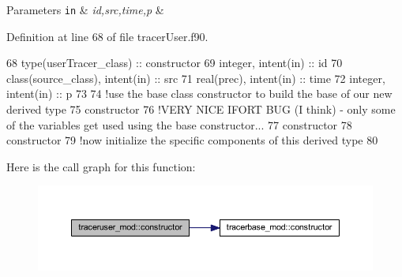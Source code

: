 \begin{DoxyParams}[1]{Parameters}
\mbox{\tt in}  & {\em id,src,time,p} & \\
\hline
\end{DoxyParams}


Definition at line 68 of file tracer\+User.\+f90.


\begin{DoxyCode}
68     \textcolor{keywordtype}{type}(userTracer\_class) :: constructor
69     \textcolor{keywordtype}{integer}, \textcolor{keywordtype}{intent(in)} :: id
70     \textcolor{keywordtype}{class}(source\_class), \textcolor{keywordtype}{intent(in)} :: src
71     \textcolor{keywordtype}{real(prec)}, \textcolor{keywordtype}{intent(in)} :: time
72     \textcolor{keywordtype}{integer}, \textcolor{keywordtype}{intent(in)} :: p
73 
74     \textcolor{comment}{!use the base class constructor to build the base of our new derived type}
75     constructor%
76     \textcolor{comment}{!VERY NICE IFORT BUG (I think) - only some of the variables get used using the base constructor...}
77     constructor%
78     constructor%
79     \textcolor{comment}{!now initialize the specific components of this derived type}
80 
\end{DoxyCode}
Here is the call graph for this function\+:\nopagebreak
\begin{figure}[H]
\begin{center}
\leavevmode
\includegraphics[width=350pt]{namespacetraceruser__mod_a9b5d52bbc9611921275ff35fa82a91c5_cgraph}
\end{center}
\end{figure}
